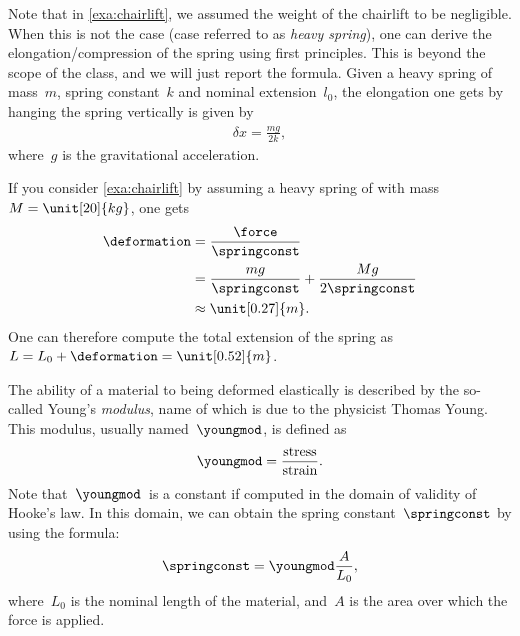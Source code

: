     Note that in \cref{exa:chairlift}, we assumed the weight of the chairlift to be negligible.
    When this is not the case (case referred to as \emph{heavy spring}), one can derive the elongation/compression of the spring using first principles.
    This is beyond the scope of the class, and we will just report the formula.
    Given a heavy spring of mass~$m$, spring constant~$k$ and nominal extension~$l_0$, the elongation one gets by hanging the spring vertically is given by
    \begin{equation}
        \begin{aligned}
            \delta x =\frac{m g}{2k},
        \end{aligned}
    \end{equation}
    where~$g$ is the gravitational acceleration.

    \begin{example}
        If you consider \cref{exa:chairlift} by assuming a heavy spring of with mass~$M=\unit[20]{kg}$, one gets
        \begin{equation}
            \begin{aligned}
                \deformation & =\frac{\force}{\springconst} \\
                             & =\frac{mg}{\springconst}+\frac{Mg}{2\springconst} \\
                             & \approx \unit[0.27]{m}.
            \end{aligned}
        \end{equation}
        One can therefore compute the total extension of the spring as~$L=L_0+\deformation=\unit[0.52]{m}$.
    \end{example}

    The ability of a material to being deformed elastically is described by the so-called Young's \emph{modulus}, name of which is due to the physicist Thomas Young.
    This modulus, usually named~$\youngmod$, is defined as
    \begin{equation}
        \youngmod=\frac{\text{stress}}{\text{strain}}.
    \end{equation}
    Note that~$\youngmod$~is a constant if computed in the domain of validity of Hooke's law.
    In this domain, we can obtain the spring constant~$\springconst$ by using the formula:
    \begin{equation}
        \springconst=\youngmod \frac{A}{L_0},
    \end{equation}
    where~$L_0$ is the nominal length of the material, and~$A$ is the area over which the force is applied.

